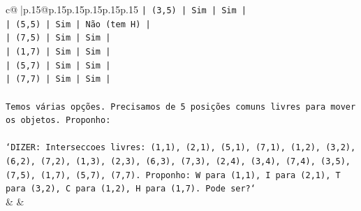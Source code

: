 \documentclass{article}
\begin{document}
{\begin{supertabular}{c@{$\;$}|p{.15\linewidth}@{}p{.15\linewidth}p{.15\linewidth}p{.15\linewidth}p{.15\linewidth}p{.15\linewidth}}
{{{\texttt{| (3,5) | Sim | Sim |} \\
\texttt{| (5,5) | Sim | Não (tem H) |} \\
\texttt{| (7,5) | Sim | Sim |} \\
\texttt{| (1,7) | Sim | Sim |} \\
\texttt{| (5,7) | Sim | Sim |} \\
\texttt{| (7,7) | Sim | Sim |} \\
\\ 
\texttt{Temos várias opções. Precisamos de 5 posições comuns livres para mover os objetos. Proponho:} \\
\\ 
\texttt{`DIZER: Interseccoes livres: (1,1), (2,1), (5,1), (7,1), (1,2), (3,2), (6,2), (7,2), (1,3), (2,3), (6,3), (7,3), (2,4), (3,4), (7,4), (3,5), (7,5), (1,7), (5,7), (7,7). Proponho: W para (1,1), I para (2,1), T para (3,2), C para (1,2), H para (1,7). Pode ser?`} \\
            }
        }
    }
    & & \\ \\


\end{supertabular}}
\end{document}
